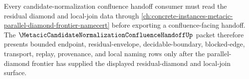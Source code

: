 Every candidate-normalization confluence handoff consumer must read the residual diamond and local-join data through \autoref{ch:concrete-instances-metacic-parallel-diamond-frontier-namecert} before exporting a confluence-facing handoff. The $\MetacicCandidateNormalizationConfluenceHandoffUp$ packet therefore presents bounded endpoint, residual-envelope, decidable-boundary, blocked-edge, transport, replay, provenance, and local naming rows only after the parallel-diamond frontier has supplied the displayed residual-diamond and local-join surface.
